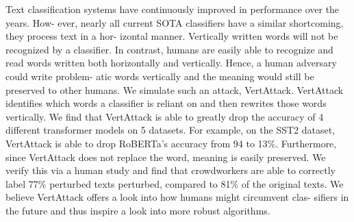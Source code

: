 Text classification systems have continuously improved in performance over the years. How- ever, nearly all current SOTA classifiers have a similar shortcoming, they process text in a hor- izontal manner. Vertically written words will not be recognized by a classifier. In contrast, humans are easily able to recognize and read words written both horizontally and vertically. Hence, a human adversary could write problem- atic words vertically and the meaning would still be preserved to other humans. We simulate such an attack, VertAttack. VertAttack identifies which words a classifier is reliant on and then rewrites those words vertically. We find that VertAttack is able to greatly drop the accuracy of 4 different transformer models on 5 datasets. For example, on the SST2 dataset, VertAttack is able to drop RoBERTa’s accuracy from 94 to 13\%. Furthermore, since VertAttack does not replace the word, meaning is easily preserved. We verify this via a human study and find that crowdworkers are able to correctly label 77\% perturbed texts perturbed, compared to 81\% of the original texts. We believe VertAttack offers a look into how humans might circumvent clas- sifiers in the future and thus inspire a look into more robust algorithms.